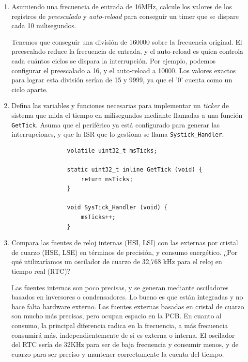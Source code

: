 \documentclass[svgnames,spanish,11pt,a4paper]{article}
\newcounter{solution}
\begin{document}
\begin{enumerate}
        \item Asumiendo una frecuencia de entrada de 16MHz, calcule los valores de los registros de \emph{preescalado} y \emph{auto-reload} para conseguir un timer que se dispare cada 10 milisegundos.
        
            \begin{solution}
                Tenemos que conseguir una división de 160000 sobre la frecuencia original. El preescalado reduce la frecuencia de entrada, y el auto-reload es quien controla cada cuántos ciclos se dispara la interrupción. Por ejemplo, podemos configurar el preescalado a 16, y el auto-reload a 10000. Los valores exactos para lograr esta división serían de 15 y 9999, ya que el '0' cuenta como un ciclo aparte.
            \end{solution}

        \item Defina las variables y funciones necesarias para implementar un \emph{ticker} de sistema que mida el tiempo en milisegundos mediante llamadas a una función \texttt{GetTick}. Asuma que el periférico ya está configurado para generar las interrupciones, y que la ISR que lo gestiona se llama \texttt{Systick\_Handler}.
        
            \begin{lstlisting}
                volatile uint32_t msTicks;
                
                static uint32_t inline GetTick (void) {
                    return msTicks;
                }

                void SysTick_Handler (void) {
                    msTicks++;
                }
            \end{lstlisting}

        
        \item Compara las fuentes de reloj internas (HSI, LSI) con las externas por cristal de cuarzo (HSE, LSE) en términos de precisión, y consumo energético. ¿Por qué utilizaríamos un oscilador de cuarzo de 32,768 kHz para el reloj en tiempo real (RTC)?
        
            \begin{solution}
                Las fuentes internas son poco precisas, y se generan mediante osciladores basados en inversores o condensadores. Lo bueno es que están integradas y no hace falta hardware externo. Las fuentes externas basadas en cristal de cuarzo son mucho más precisas, pero ocupan espacio en la PCB. En cuanto al consumo, la principal diferencia radica en la frecuencia, a más frecuencia consumirá más, independientemente de si es externa o interna. El oscilador del RTC sería de 32KHz para ser de baja frecuencia y consumir menos, y de cuarzo para ser preciso y mantener correctamente la cuenta del tiempo.
            \end{solution}



\end{enumerate}
\end{document}

